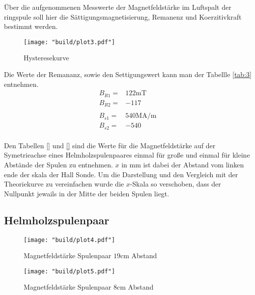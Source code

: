 Über die aufgenommenen Messwerte der Magnetfeldstärke im Luftspalt der ringspule soll hier 
die Sättigungsmagnetisierung, Remanenz und Koerzitivkraft bestimmt werden.
\begin{figure}[H]
    \caption{Hysteresekurve}
    \label{fig:3}
    \centering
    \texttt{[image: "build/plot3.pdf"]}
\end{figure}
Die Werte der Remananz, sowie den Settigungswert kann man der Tabellle \autoref{tab:3} entnehmen.
\begin{align*}
    B_{R1} =& 122 \unit{\milli\tesla}\\
    B_{R2} =& -117\\
&\\
    B_{s1} =& 540 \unit{\mega\ampere\per\meter}\\
    B_{s2} =& -540\\
\end{align*}





Den Tabellen \autoref{} und \autoref{} sind die Werte für die Magnetfeldstärke auf der 
Symetrieachse eines Helmholzspulenpaares einmal für große und einmal für kleine 
Abstände der Spulen zu entnehmen. $x$ in $\unit{\milli\meter} $ ist dabei der Abstand 
vom linken ende der skala der Hall Sonde. Um die Darstellung und den Vergleich mit der 
Theoriekurve zu vereinfachen wurde die $x$-Skala so verschoben, dass der Nullpunkt jewails 
in der Mitte der beiden Spulen liegt.
\subsection{Helmholzspulenpaar}
\begin{figure}
    \caption{Magnetfeldstärke Spulenpaar $19\unit{\centi\meter}$ Abstand}
    \label{fig:4}
    \centering
    \texttt{[image: "build/plot4.pdf"]}
\end{figure}

\begin{figure}
    \caption{Magnetfeldstärke Spulenpaar $8\unit{\centi\meter}$ Abstand}
    \label{fig:5}
    \centering
    \texttt{[image: "build/plot5.pdf"]}
\end{figure}